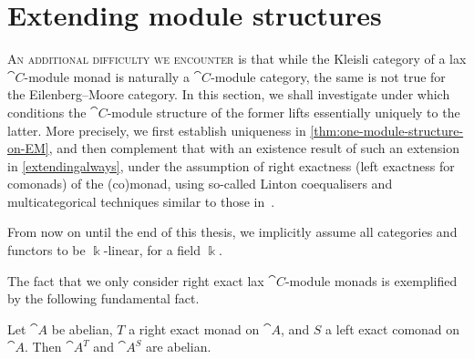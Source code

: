\section{Extending module structures}

\textsc{An additional difficulty we encounter}
is that while the Kleisli category of a lax \(\cat{C}\)\hyp{}module monad is naturally a \(\cat{C}\)\hyp{}module category,
the same is not true for the Eilenberg--Moore category.
In this section, we shall investigate under which conditions the \(\cat{C}\)\hyp{}module structure of the former lifts essentially uniquely to the latter.
More precisely,
we first establish uniqueness in \cref{thm:one-module-structure-on-EM},
and then complement that with an existence result of such an extension in \cref{extendingalways},
under the assumption of right exactness (left exactness for comonads) of the (co)monad,
using so-called Linton coequalisers and multicategorical techniques similar to those in~\cite{aguiar18:monad}.

\begin{hypothesis}\label{hyp:deligne-reconstr}
  From now on until the end of this thesis, we implicitly assume all categories and functors to be \(\Bbbk\)\hyp{}linear,
  for a field \(\Bbbk\).
\end{hypothesis}

The fact that we only consider right exact lax \(\cat{C}\)\hyp{}module monads
is exemplified by the following fundamental fact.

\begin{proposition}\label{prop:abelian-EM-cat}
  Let \(\cat{A}\) be abelian,
  \(T\) a right exact monad on \(\cat{A}\),
  and \(S\) a left exact comonad on \(\cat{A}\).
  Then \(\cat{A}^T\) and \(\cat{A}^S\) are abelian.
\end{proposition}

